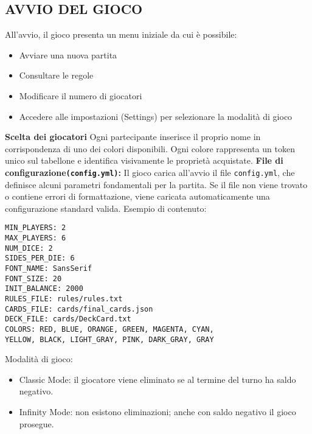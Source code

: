 \subsection{AVVIO DEL GIOCO}
All’avvio, il gioco presenta un menu iniziale da cui è possibile:\newline
\begin{itemize}
    \item Avviare una nuova partita
    \item Consultare le regole
    \item Modificare il numero di giocatori
    \item Accedere alle impostazioni (Settings) per selezionare la modalità di gioco
\end{itemize}
\textbf{Scelta dei giocatori}\newline
Ogni partecipante inserisce il proprio nome in corrispondenza di uno dei colori disponibili. Ogni colore rappresenta un token unico sul tabellone e identifica visivamente le proprietà acquistate.\newline
\textbf{File di configurazione\texttt{(config.yml)}:}\newline
Il gioco carica all’avvio il file \texttt{config.yml}, che definisce alcuni parametri fondamentali per la partita. Se il file non viene trovato o contiene errori di formattazione, viene caricata automaticamente una configurazione standard valida.\newline
Esempio di contenuto:\newline
\begin{verbatim}
MIN_PLAYERS: 2
MAX_PLAYERS: 6
NUM_DICE: 2
SIDES_PER_DIE: 6
FONT_NAME: SansSerif
FONT_SIZE: 20
INIT_BALANCE: 2000
RULES_FILE: rules/rules.txt
CARDS_FILE: cards/final_cards.json
DECK_FILE: cards/DeckCard.txt
COLORS: RED, BLUE, ORANGE, GREEN, MAGENTA, CYAN, 
YELLOW, BLACK, LIGHT_GRAY, PINK, DARK_GRAY, GRAY
\end{verbatim}
Modalità di gioco:\newline
\begin{itemize}
    \item Classic Mode: il giocatore viene eliminato se al termine del turno ha saldo negativo.
    \item Infinity Mode: non esistono eliminazioni; anche con saldo negativo il gioco prosegue.
\end{itemize}
